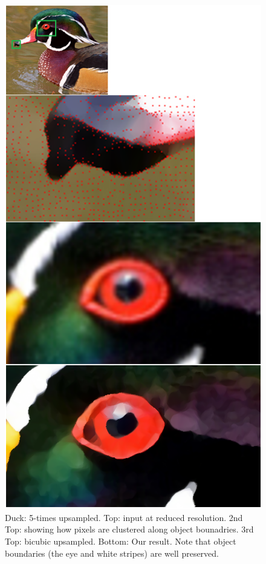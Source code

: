 \begin{figure}[htbp]\centering
\includegraphics{imagesPM/f5.png}
\caption{Duck: 5-times upsampled. Top: input at reduced resolution. 2nd Top: showing how pixels are clustered along object bounadries. 3rd Top: bicubic upsampled. Bottom: Our result. Note that object boundaries (the eye and white stripes) are well preserved.}
\label{fig:genDuck}
\end{figure}

